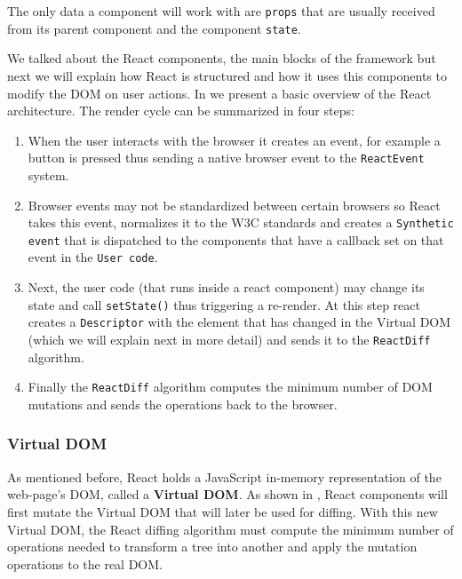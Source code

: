The only data a component will work with are \texttt{props} that are  usually received from its parent component and the component \texttt{state}.

We talked about the React components, the main blocks of the framework but next we will explain how React is structured and how it uses this components to modify the DOM on user actions. In  we present a basic overview of the React architecture. The render cycle can be summarized in four steps:

\begin{enumerate}
	\item When the user interacts with the browser it creates an event, for example a button is pressed thus sending a native browser event to the \texttt{ReactEvent} system.
	\item  Browser events may not be standardized between certain browsers so React takes this event, normalizes it to the W3C standards and creates a \texttt{Synthetic event} that is dispatched to the components that have a callback set on that event in the \texttt{User code}.
	\item Next, the user code (that runs inside a react component) may change its state and call \texttt{setState()} thus triggering a re-render. At this step react creates a \texttt{Descriptor} with the element that has changed in the Virtual DOM (which we will explain next in more detail) and sends it to the \texttt{ReactDiff} algorithm.
	\item Finally the \texttt{ReactDiff} algorithm computes the minimum number of DOM mutations and sends the operations back to the browser.
\end{enumerate}


\subsubsection{Virtual DOM}
\label{sub-sub-sec:virtual-dom}

As mentioned before, React holds a JavaScript in-memory representation of the web-page's DOM, called a \textbf{Virtual DOM}. As shown in , React components will first mutate the Virtual DOM that will later be used for diffing. With this new Virtual DOM, the React diffing algorithm must compute the minimum number of operations needed to transform a tree into another and apply the mutation operations to the real DOM.


